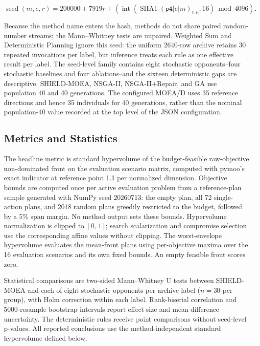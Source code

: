 \documentclass[energies,article,submit,moreauthors]{Definitions/mdpi}
\begin{document}
\[
\operatorname{seed}(m,e,r)=200000+7919r+
\left(\operatorname{int}(\operatorname{SHA1}(\texttt{p4}|e|m)_{1:6},16)\bmod4096\right).
\]

Because the method name enters the hash, methods do not share paired random-number streams; the Mann--Whitney tests are unpaired. Weighted Sum and Deterministic Planning ignore this seed: the uniform 2640-row archive retains 30 repeated invocations per label, but inference treats each rule as one effective result per label. The seed-level family contains eight stochastic opponents--four stochastic baselines and four ablations--and the sixteen deterministic gaps are descriptive. SHIELD-MOEA, NSGA-II, NSGA-II+Repair, and GA use population 40 and 40 generations. The configured MOEA/D uses 35 reference directions and hence 35 individuals for 40 generations, rather than the nominal population-40 value recorded at the top level of the JSON configuration.

\subsection{Metrics and Statistics}\label{metrics-and-statistics}

The headline metric is standard hypervolume of the budget-feasible raw-objective non-dominated front on the evaluation scenario matrix, computed with pymoo's exact indicator at reference point 1.1 per normalized dimension. Objective bounds are computed once per active evaluation problem from a reference-plan sample generated with NumPy seed 20260713: the empty plan, all 72 single-action plans, and 2048 random plans greedily restricted to the budget, followed by a 5\% span margin. No method output sets these bounds. Hypervolume normalization is clipped to \([0,1]\); search scalarization and compromise selection use the corresponding affine values without clipping. The worst-envelope hypervolume evaluates the mean-front plans using per-objective maxima over the 16 evaluation scenarios and its own fixed bounds. An empty feasible front scores zero.

Statistical comparisons are two-sided Mann--Whitney U tests between SHIELD-MOEA and each of eight stochastic opponents per archive label (\(n=30\) per group), with Holm correction \cite{ref44} within each label. Rank-biserial correlation and 5000-resample bootstrap intervals report effect size and mean-difference uncertainty. The deterministic rules receive point comparisons without seed-level p-values. All reported conclusions use the method-independent standard hypervolume defined below.
\end{document}
